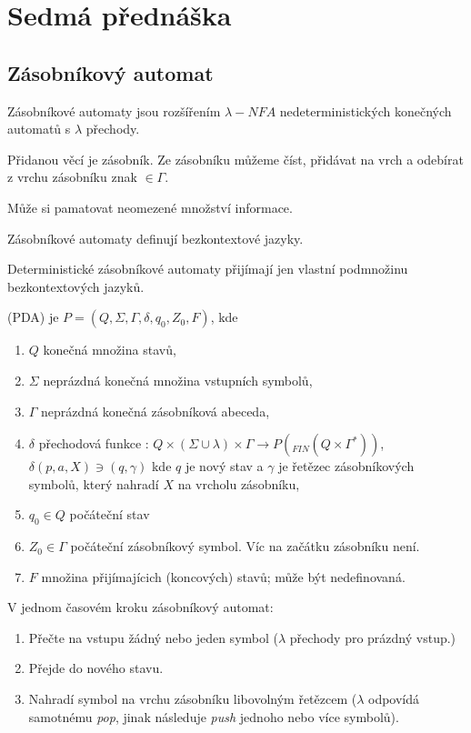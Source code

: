 \documentclass[../main.tex]{subfiles}
\begin{document}
\section{Sedmá přednáška}

    \subsection{Zásobníkový automat}

    Zásobníkové automaty jsou rozšířením $\lambda -NFA$ nedeterministických konečných
    automatů s $\lambda$ přechody.

    Přidanou věcí je zásobník. Ze zásobníku můžeme číst, přidávat na vrch a odebírat
    z vrchu zásobníku znak $\in \Gamma$.

    Může si pamatovat neomezené množství informace.

    Zásobníkové automaty definují bezkontextové jazyky.

    Deterministické zásobníkové automaty přijímají jen vlastní podmnožinu bezkontextových jazyků.

    \begin{definition}
        (PDA) je $P = (Q, \Sigma, \Gamma, \delta, q_0, Z_0, F)$, kde 
        \begin{enumerate}
            \item $Q$ konečná množina stavů,
            \item $\Sigma$ neprázdná konečná množina vstupních symbolů,
            \item $\Gamma$ neprázdná konečná zásobníková abeceda,
            \item $\delta$ přechodová funkce : $Q \times (\Sigma \cup {\lambda})
            \times \Gamma \rightarrow P(_{FIN}(Q\times \Gamma^*))$, $\delta (p,a,X) \ni (q,\gamma)$
            kde $q$ je nový stav a $\gamma$ je řetězec zásobníkových symbolů, který nahradí $X$ na vrcholu zásobníku,
            \item $q_0 \in Q$ počáteční stav
            \item $Z_0 \in \Gamma$ počáteční zásobníkový symbol. Víc na začátku zásobníku není.
            \item $F$ množina přijímajícich (koncových) stavů; může být nedefinovaná.
        \end{enumerate}

        V jednom časovém kroku zásobníkový automat:
        \begin{enumerate}
            \item Přečte na vstupu žádný nebo jeden symbol ($\lambda$ přechody pro prázdný vstup.)
            \item Přejde do nového stavu.
            \item Nahradí symbol na vrchu zásobníku libovolným řetězcem ($\lambda$ odpovídá samotnému \textit{pop},
            jinak následuje \textit{push} jednoho nebo více symbolů).
        \end{enumerate}
    \end{definition}
\end{document}
